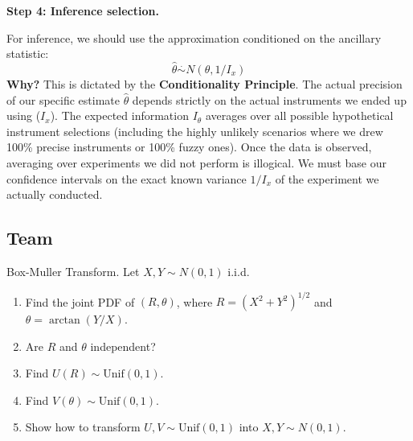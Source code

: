 \begin{solution}
\textbf{Step 4: Inference selection.}

For inference, we should use the approximation conditioned on the ancillary statistic:
\[ \hat{\theta} \stackrel{.}{\sim} N(\theta, 1/I_x) \]
\textbf{Why?} This is dictated by the \textbf{Conditionality Principle}. The actual precision of our specific estimate $\hat{\theta}$ depends strictly on the actual instruments we ended up using ($I_x$). The expected information $I_\theta$ averages over all possible hypothetical instrument selections (including the highly unlikely scenarios where we drew 100\% precise instruments or 100\% fuzzy ones). Once the data is observed, averaging over experiments we did not perform is illogical. We must base our confidence intervals on the exact known variance $1/I_x$ of the experiment we actually conducted.
\end{solution}

\subsection{Team}

\begin{exercise}\label{probability:2011:7}
Box-Muller Transform. Let $X, Y \sim N(0,1)$ i.i.d.
\begin{enumerate}
    \item Find the joint PDF of $(R, \theta)$, where $R = (X^2 + Y^2)^{1/2}$ and $\theta = \arctan(Y/X)$.
    \item Are $R$ and $\theta$ independent?
    \item Find $U(R) \sim \text{Unif}(0,1)$.
    \item Find $V(\theta) \sim \text{Unif}(0,1)$.
    \item Show how to transform $U, V \sim \text{Unif}(0,1)$ into $X, Y \sim N(0,1)$.
\end{enumerate}
\end{exercise}

